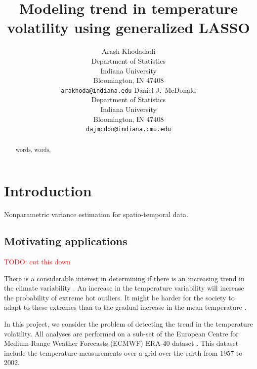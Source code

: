 \documentclass{article}
\title{Modeling trend in temperature volatility using generalized LASSO}
\author{Arash Khodadadi\\
 Department of Statistics\\
 Indiana University\\
 Bloomington, IN 47408 \\
 \texttt{arakhoda@indiana.edu}
\And
  Daniel J.\ McDonald \\
 Department of Statistics\\
 Indiana University\\
 Bloomington, IN 47408 \\
 \texttt{dajmcdon@indiana.cmu.edu}}
\newcommand{\attn}[1]{\textcolor{red}{TODO: #1}}
\begin{document}
 


\maketitle


\begin{abstract}
words, words,

\end{abstract}



\section{Introduction}

Nonparametric variance estimation for spatio-temporal data.

\subsection{Motivating applications}

\attn{cut this down}

There is a considerable interest in determining if there is an
increasing trend in the climate variability
\citep{hansen_perception_2012,huntingford_no_2013}. An increase in the
temperature variability will increase the probability of extreme hot
outliers. It might be harder for the society to adapt to these
extremes than to the gradual increase in the mean temperature
\citep{huntingford_no_2013}. 

In this project, we consider the problem of detecting the trend in the
temperature volatility. All analyses are performed on a sub-set of the
European Centre for Medium-Range Weather Forecasts (ECMWF) ERA-40
dataset \citep{uppala_era-40_2005}. This dataset include the
temperature measurements over a grid over the earth from 1957 to
2002.~\citep{VasseurDeLong2014,TrenberthZhang2014,StatenKahn2016,Screen2014,FischerBeyerle2013} 
\end{document}
